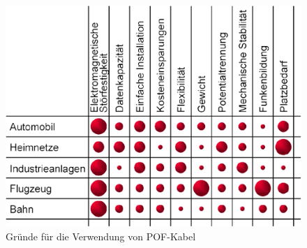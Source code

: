\begin{figure}[h]
    \begin{center}
        \begin{minipage}[t]{\textwidth}
            \begin{center}
                \includegraphics[height=0.2\textheight]{Bilder/Optische_Wellenleiter_Die_Polymer_Optische_Faser/Allgemeines/pofgrund.png}
                \caption[Gründe für die Verwendung von POF-Kabel \newline \url{http://www.pofac.fh-nuernberg.de/pofac/de/was_sind_pof/images/warum_pof.png}]{Gründe für die Verwendung von POF-Kabel}
                \label{fig:pofgrund}
            \end{center}
        \end{minipage}
    \end{center}
\end{figure}
